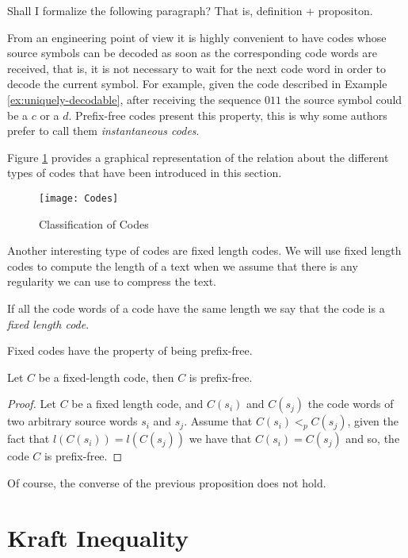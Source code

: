 {\color{red} Shall I formalize the following paragraph? That is, definition + propositon.}

From an engineering point of view it is highly convenient to have codes whose source symbols can be decoded as soon as the corresponding code words are received, that is, it is not necessary to wait for the next code word in order to decode the current symbol. For example, given the code described in Example \ref{ex:uniquely-decodable}, after receiving the sequence $011$ the source symbol could be a $c$ or a $d$. Prefix-free codes present this property, this is why some authors prefer to call them \emph{instantaneous codes}.

Figure \ref{fig:Classification-Codes} provides a graphical representation of the relation about the different types of codes that have been introduced in this section.

\begin{figure}[h]
\centering\texttt{[image: Codes]}
\caption{\label{fig:Classification-Codes}Classification of Codes}
\end{figure}

Another interesting type of codes are fixed length codes. We will use fixed length codes to compute the length of a text when we assume that there is any regularity we can use to compress the text.

\begin{definition}
\label{def:Fixed-Length-Codes}
If all the code words of a code have the same length we say that the code is a \emph{fixed length code}.
\end{definition}

Fixed codes have the property of being prefix-free.

\begin{proposition}
Let $C$ be a fixed-length code, then $C$ is prefix-free.
\end{proposition}
\begin{proof}
Let $C$ be a fixed length code, and $C(s_i)$ and $C(s_j)$ the code words of two arbitrary source words $s_i$ and $s_j$. Assume that $C(s_i) <_p C(s_j)$, given the fact that $l(C(s_i)) = l(C(s_j))$ we have that $C(s_i) = C(s_j)$ and so, the code $C$ is prefix-free.
\end{proof}

Of course, the converse of the previous proposition does not hold.

%
%

\section{Kraft Inequality}

